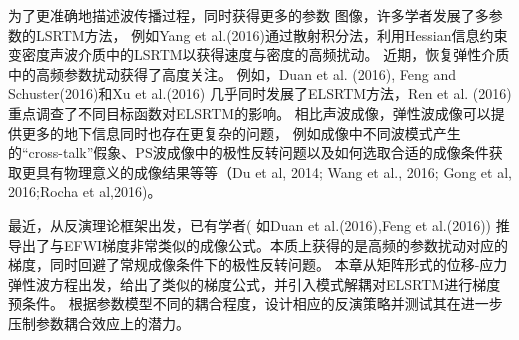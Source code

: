 为了更准确地描述波传播过程，同时获得更多的参数
图像，许多学者发展了多参数的LSRTM方法，
例如Yang et
al.(2016)\cite{Yang2016}通过散射积分法，利用Hessian信息约束变密度声波介质中的LSRTM以获得速度与密度的高频扰动。
近期，恢复弹性介质中的高频参数扰动获得了高度关注。
例如，Duan et al. (2016)\cite{Duan2016}, Feng and Schuster(2016)\cite{Feng2016}和Xu et al.(2016)
\cite{Xu2016}几乎同时发展了ELSRTM方法，Ren et al. (2016)\cite{RenEtAl2016}重点调查了不同目标函数对ELSRTM的影响。
相比声波成像，弹性波成像可以提供更多的地下信息同时也存在更复杂的问题，
例如成像中不同波模式产生的“cross-talk”假象、PS波成像中的极性反转问题以及如何选取合适的成像条件获取更具有物理意义的成像结果等等（Du et al,
2014\cite{DuEtAl2014}; Wang et al.,
2016\cite{wang2016scalar}; Gong et
al, 2016\cite{GongEtAl2016};Rocha et al,2016\cite{RochaEtAl2016a})。

最近，从反演理论框架出发，已有学者(
如Duan et al.(2016)\cite{Duan2016},Feng et
al.(2016)\cite{Feng2016})
推导出了与EFWI梯度非常类似的成像公式。本质上获得的是高频的参数扰动对应的梯度，同时回避了常规成像条件下的极性反转问题。
本章从矩阵形式的位移-应力弹性波方程出发，给出了类似的梯度公式，并引入模式解耦对ELSRTM进行梯度预条件。
根据参数模型不同的耦合程度，设计相应的反演策略并测试其在进一步压制参数耦合效应上的潜力。
